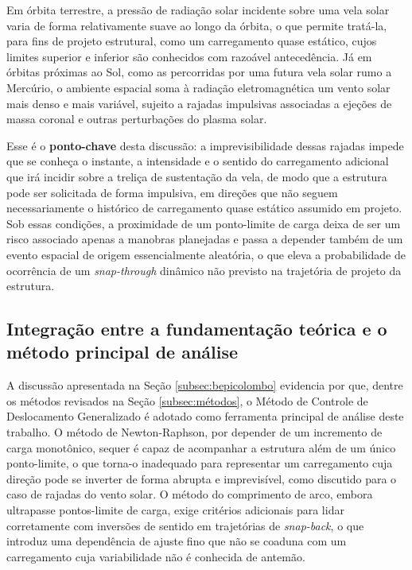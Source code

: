 Em órbita terrestre, a pressão de radiação solar incidente sobre uma vela solar varia de forma relativamente suave ao longo da órbita, o que permite tratá-la, para fins de projeto estrutural, como um carregamento quase estático, cujos limites superior e inferior são conhecidos com razoável antecedência. Já em órbitas próximas ao Sol, como as percorridas por uma futura vela solar rumo a Mercúrio, o ambiente espacial soma à radiação eletromagnética um vento solar mais denso e mais variável, sujeito a rajadas impulsivas associadas a ejeções de massa coronal e outras perturbações do plasma solar.

Esse é o \textbf{ponto-chave} desta discussão: a imprevisibilidade dessas rajadas impede que se conheça o instante, a intensidade e o sentido do carregamento adicional que irá incidir sobre a treliça de sustentação da vela, de modo que a estrutura pode ser solicitada de forma impulsiva, em direções que não seguem necessariamente o histórico de carregamento quase estático assumido em projeto. Sob essas condições, a proximidade de um ponto-limite de carga deixa de ser um risco associado apenas a manobras planejadas e passa a depender também de um evento espacial de origem essencialmente aleatória, o que eleva a probabilidade de ocorrência de um \textit{snap-through} dinâmico não previsto na trajetória de projeto da estrutura.



\subsection{Integração entre a fundamentação teórica e o método principal de análise}
\label{subsec:integração}

A discussão apresentada na Seção \ref{subsec:bepicolombo} evidencia por que, dentre os métodos revisados na Seção \ref{subsec:métodos}, o Método de Controle de Deslocamento Generalizado é adotado como ferramenta principal de análise deste trabalho. O método de Newton-Raphson, por depender de um incremento de carga monotônico, sequer é capaz de acompanhar a estrutura além de um único ponto-limite, o que torna-o inadequado para representar um carregamento cuja direção pode se inverter de forma abrupta e imprevisível, como discutido para o caso de rajadas do vento solar. O método do comprimento de arco, embora ultrapasse pontos-limite de carga, exige critérios adicionais para lidar corretamente com inversões de sentido em trajetórias de \textit{snap-back}, o que introduz uma dependência de ajuste fino que não se coaduna com um carregamento cuja variabilidade não é conhecida de antemão.

